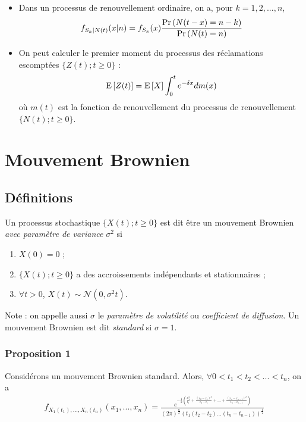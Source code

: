 \documentclass[10pt, french, landscape]{article}
\begin{document}
\begin{multicols*}{3}
\begin{itemize}
\item Dans un processus de renouvellement ordinaire, on a, pour $k = 1, 2, ..., n$,
\begin{align*}
f_{S_k | N(t)}(x | n) = f_{S_k}(x) \frac{\Pr \left( N(t-x) = n-k \right)}{\Pr \left( N(t) = n \right)}
\end{align*}

\item On peut calculer le premier moment du processus des réclamations escomptées $\{ Z(t) ; t \geq 0 \}$ : 
\[\mathrm{E} \left[ Z(t) \right] = \mathrm{E} \left[ X \right] \int_{0}^{t} e^{-\delta x} d m(x) \]
où $m(t)$ est la fonction de renouvellement du processus de renouvellement $\{ N(t) ; t \geq 0 \}$.
\end{itemize}

\section{Mouvement Brownien}
\subsection*{Définitions}
\begin{definition}
Un processus stochastique $\{ X(t) ; t \geq 0 \}$ est dit être un mouvement Brownien \emph{avec paramètre de variance} $\sigma^2$ si
\begin{enumerate}[label=(\arabic*)]
\item $X(0) = 0$ ;
\item $\{ X(t) ; t \geq 0 \}$  a des accroissements indépendants et stationnaires ;
\item $\forall t > 0$, $X(t) \sim \mathcal{N}(0, \sigma^2 t)$.
\end{enumerate}
\end{definition}
Note : on appelle aussi $\sigma$ le \emph{paramètre de volatilité} ou \emph{coefficient de diffusion}. Un mouvement Brownien est dit \emph{standard} si $\sigma = 1$.

\subsubsection*{Proposition 1}
Considérons un mouvement Brownien standard. Alors, $\forall 0 < t_1 < t_2 < ... < t_{n}$, on a
\begin{align*}
f_{X_1(t_1), ..., X_n(t_n)}(x_1, ..., x_n) = \frac{e^{-\frac{1}{2} \left(\frac{x_1^2}{t_1} + \frac{(x_2 - x_1)^2}{t_2 - t_1} + ... + \frac{(x_n - x_{n-1})^2}{t_n - t_{n-1}} \right)}}{(2 \pi)^{\frac{n}{2}} (t_1 (t_2 - t_2) ... (t_n - t_{n-1}))^{\frac{1}{2}}} 
\end{align*}


\end{multicols*}
\end{document}
